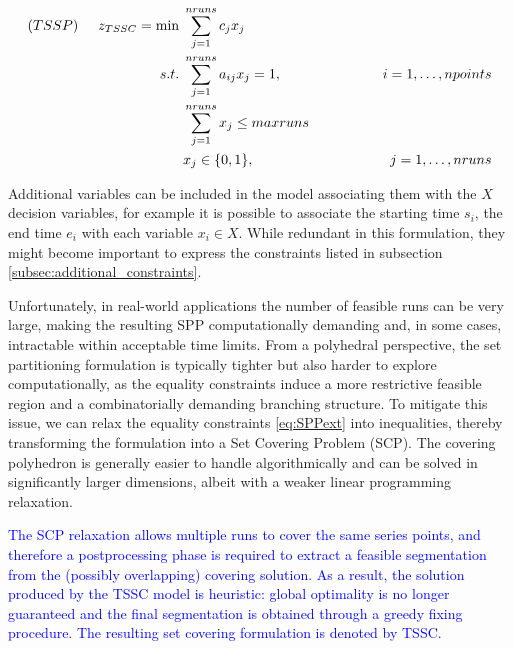 \documentclass[preprints,article,submit,pdftex,moreauthors]{Definitions/mdpi}
\newcommand{\highlight}[1]{\textcolor{blue}{#1}}
\begin{document}
\begin{alignat}{4}
	(TSSP) \hspace{0.5cm} z_{TSSC} = \min &\; \sum_{j=1}^{nruns} c_j x_{j}  \label{eq:SCPobj} \\
	s.t. &\; \sum_{j=1}^{nruns}a_{ij}x_{j} = 1, & \hspace{1.5cm} i=1,\dots,npoints  \label{eq:SCPcov} \\
	&\; \sum_{j=1}^{nruns} x_{j} \leq maxruns \label{eq:SPPext}\\
	&\; x_j \in \{0,1\}, &\; j=1,\dots,nruns  \label{eq:SCPvar}
\end{alignat}

Additional variables can be included in the model associating them with the $X$ decision variables, for example it is possible to associate the starting time $s_i$, the end time $e_i$ with each variable $x_i \in X$. While redundant in this formulation, they might become important to express the constraints listed in subsection \ref{subsec:additional_constraints}.

Unfortunately, in real-world applications the number of feasible runs can be very large, making the resulting SPP computationally demanding and, in some cases, intractable within acceptable time limits. From a polyhedral perspective, the set partitioning formulation is typically tighter but also harder to explore computationally, as the equality constraints induce a more restrictive feasible region and a combinatorially demanding branching structure. To mitigate this issue, we can relax the equality constraints \ref{eq:SPPext} into inequalities, thereby transforming the formulation into a Set Covering Problem (SCP). The covering polyhedron is generally easier to handle algorithmically and can be solved in significantly larger dimensions, albeit with a weaker linear programming relaxation. 

\highlight{The SCP relaxation allows multiple runs to cover the same series points, and therefore a postprocessing phase is required to extract a feasible segmentation from the (possibly overlapping) covering solution. As a result, the solution produced by the TSSC model is heuristic: global optimality is no longer guaranteed and the final segmentation is obtained through a  greedy fixing procedure. The resulting set covering formulation is denoted by TSSC.}
\end{document}
